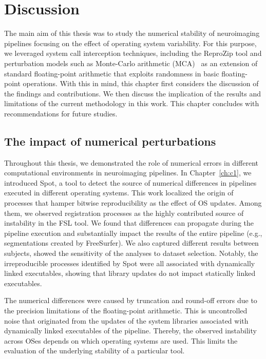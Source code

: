\chapter{Discussion}
\label{ch:discussion}

The main aim of this thesis was to study the numerical stability of neuroimaging pipelines focusing on the effect
of operating system variability. For this purpose, we leveraged system call interception techniques, including
the ReproZip tool and perturbation models such as Monte-Carlo arithmetic (MCA)~\cite{Parker1997-qq} as an extension of
standard floating-point arithmetic that exploits randomness in basic floating-point operations.
With this in mind, this chapter first considers the discussion of the findings and contributions.
We then discuss the implication of the results and limitations of the current methodology in this work.
This chapter concludes with recommendations for future studies.


\section{The impact of numerical perturbations}

Throughout this thesis, we demonstrated the role of numerical errors in different computational environments in neuroimaging pipelines.
In Chapter~\ref{ch:c1}, we introduced Spot, a tool to detect the source of numerical differences in pipelines
executed in different operating systems. 
This work localized the origin of processes that hamper bitwise reproducibility as the effect of OS updates.
Among them, we observed registration processes as the highly contributed source of instability in the FSL tool. 
We found that differences can propagate during the pipeline execution and substantially impact
the results of the entire pipeline (e.g., segmentations created by FreeSurfer).
We also captured different results between subjects, showed the sensitivity of the analyses to dataset selection.
Notably, the irreproducible processes identified by Spot were all associated with dynamically linked executables,
showing that library updates do not impact statically linked executables.


The numerical differences were caused by truncation and round-off errors
due to the precision limitations of the floating-point arithmetic.
This is uncontrolled noise that originated from the updates of the system libraries associated with
dynamically linked executables of the pipeline. Thereby, the observed instability across OSes
depends on which operating systems are used. This limits the evaluation of the underlying stability of a particular tool.

